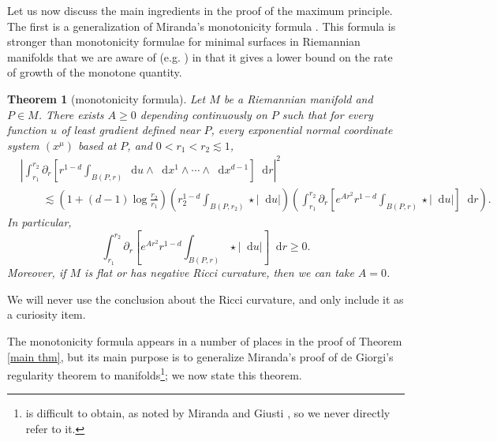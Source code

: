\documentclass[reqno,10pt]{amsart}
\newcommand{\ZZ}{\mathbf{Z}}
\newcommand*\dif{\mathop{}\!\mathrm{d}}
\newtheorem{mainthm}{Theorem}
\theoremstyle{definition}
\numberwithin{equation}{section}
\begin{document}

Let us now discuss the main ingredients in the proof of the maximum principle.
The first is a generalization of Miranda's monotonicity formula \cite[Theorem 2.8]{Miranda66}.
This formula is stronger than monotonicity formulae for minimal surfaces in Riemannian manifolds that we are aware of (e.g. \cite[\S7]{MarquesXX}) in that it gives a lower bound on the rate of growth of the monotone quantity.

\begin{mainthm}[monotonicity formula]\label{monotonicity prestate}
Let $M$ be a Riemannian manifold and $P \in M$. There exists $A \geq 0$ depending continuously on $P$ such that for every function $u$ of least gradient defined near $P$, every exponential normal coordinate system $(x^\mu)$ based at $P$, and $0 < r_1 < r_2 \lesssim 1$,
\begin{align*}
&\left|\int_{r_1}^{r_2} \partial_r \left[r^{1 - d} \int_{B(P, r)} \dif u \wedge \dif x^1 \wedge \cdots \wedge \dif x^{d - 1}\right] \dif r\right|^2 \\
&\qquad \lesssim \left(1 + (d - 1) \log \frac{r_2}{r_1}\right) \left(r_2^{1 - d}\int_{B(P, r_2)} \star |\dif u| \right)\left(\int_{r_1}^{r_2} \partial_r \left[e^{Ar^2} r^{1 - d} \int_{B(P, r)} \star |\dif u|\right] \dif r\right).
\end{align*}
In particular,
\begin{equation}\label{weak monotonicity}
\int_{r_1}^{r_2} \partial_r \left[e^{Ar^2} r^{1 - d} \int_{B(P, r)} \star |\dif u|\right] \dif r \geq 0.
\end{equation}
Moreover, if $M$ is flat or has negative Ricci curvature, then we can take $A = 0$.
\end{mainthm}

We will never use the conclusion about the Ricci curvature, and only include it as a curiosity item.

The monotonicity formula appears in a number of places in the proof of Theorem \ref{main thm}, but its main purpose is to generalize Miranda's proof \cite{Miranda66} of de Giorgi's regularity theorem \cite{deGiorgi61} to manifolds\footnote{\cite{deGiorgi61} is difficult to obtain, as noted by Miranda and Giusti \cite{Miranda66, Giusti77}, so we never directly refer to it.}; we now state this theorem.
\end{document}
